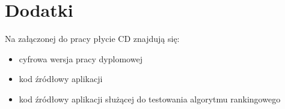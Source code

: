 \chapter*{Dodatki}
Na załączonej do pracy płycie CD znajdują się:
\begin{itemize}
\item cyfrowa wersja pracy dyplomowej
\item kod źródłowy aplikacji
\item kod źródłowy aplikacji służącej do testowania algorytmu rankingowego
\end{itemize}